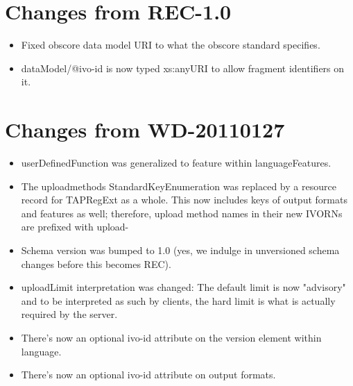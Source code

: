 \documentclass{ivoa}
\begin{document}
\label{changes}

\section{Changes from REC-1.0}

\label{changes-rec-1.0}

\begin{itemize}

\item Fixed obscore data model URI to what the obscore standard specifies.{}

\item dataModel/@ivo-id is now typed xs:anyURI
to allow fragment identifiers on it.{}

\end{itemize}

\section{Changes from WD-20110127}

\label{changes-20110127}

\begin{itemize}

\item userDefinedFunction was generalized to feature within languageFeatures.{}

\item The uploadmethods StandardKeyEnumeration was replaced by a
resource record for TAPRegExt as a whole.  This now includes keys of output
formats and features as well; therefore, upload method names in their new
IVORNs are prefixed with upload-{}

\item Schema version was bumped to 1.0 (yes, we indulge in unversioned
schema changes before this becomes REC).{}

\item uploadLimit interpretation was changed: The default limit is now
"advisory" and to be interpreted as such by clients, the hard limit
is what is actually required by the server.{}

\item There's now an optional ivo-id attribute on the version element
within language.{}

\item There's now an optional ivo-id attribute on output formats.{}

\end{itemize}
\end{document}
